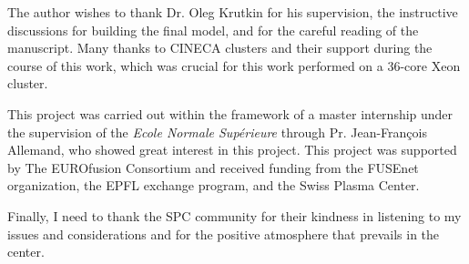 \documentclass[11pt,openany]{report}
\begin{document}
\begin{multicols}{2}
    The author wishes to thank Dr. Oleg Krutkin for his supervision, the instructive discussions for building the final model, and for the careful reading of the manuscript. Many thanks to CINECA clusters and their support during the course of this work, which was crucial for this work performed on a 36-core Xeon cluster.

    This project was carried out within the framework of a master internship under the supervision of the \textit{Ecole Normale Supérieure} through Pr. Jean-François Allemand, who showed great interest in this project. This project was supported by The EUROfusion Consortium and received funding from the FUSEnet organization, the EPFL exchange program, and the Swiss Plasma Center.

    Finally, I need to thank the SPC community for their kindness in listening to my issues and considerations and for the positive atmosphere that prevails in the center.

    \nocite{*}
    \printbibliography
\end{multicols}
\end{document}
